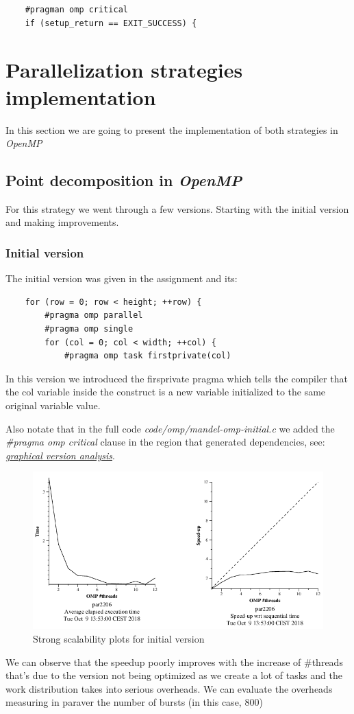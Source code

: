 \documentclass{article}
\begin{document}
\begin{lstlisting}
    #pragman omp critical
    if (setup_return == EXIT_SUCCESS) {
\end{lstlisting}
\newpage
\section{Parallelization strategies implementation}
In this section we are going to present the implementation of both strategies in \textit{OpenMP}
\subsection{Point decomposition in \textit{OpenMP}}
For this strategy we went through a few versions. Starting with the initial version and making improvements.
\subsubsection*{Initial version}
The initial version was given in the assignment and its:
\begin{lstlisting}
    for (row = 0; row < height; ++row) {
        #pragma omp parallel
        #pragma omp single
        for (col = 0; col < width; ++col) {
            #pragma omp task firstprivate(col)

\end{lstlisting}
\justify
In this version we introduced the firsprivate pragma which tells the compiler that the col variable inside the construct is a new variable initialized to the same original variable value.

\justify
Also notate that in the full code \textit{code/omp/mandel-omp-initial.c} we added the \textit{\#pragma omp critical} clause in the region that generated dependencies, see: \hyperref[sec:graphical]{\textit{graphical version analysis}}.


\begin{figure}[h]
    \centering
    \includegraphics[width=1\textwidth]{strongPoint.png}
    \caption{Strong scalability plots for initial version}
    \label{fig:strongpoint}
\end{figure}
\justify
We can observe that the speedup poorly improves with the increase of \#threads that's due to the version not being optimized as we create a lot of tasks and the work distribution takes into serious overheads. We can evaluate the overheads measuring in paraver the number of bursts (in this case, 800)
\end{document}
